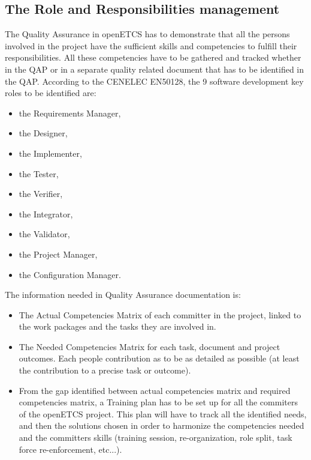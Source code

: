 \documentclass[openetcs]{template/openetcs_article}
\begin{document}
\subsection{The Role and Responsibilities management}
The Quality Assurance in openETCS has to demonstrate that all the persons involved in the project have the sufficient skills and competencies to fulfill their
responsibilities. All these competencies have to be gathered and tracked whether in the QAP or in a separate quality related document that has to be identified
in the QAP.
According to the CENELEC EN50128, the 9 software development key roles to be identified are:
\begin{itemize}
\item the Requirements Manager,
\item the Designer,
\item the Implementer,
\item the Tester,
\item the Verifier,
\item the Integrator,
\item the Validator,
\item the Project Manager,
\item the Configuration Manager.
\end{itemize}

The information needed in Quality Assurance documentation is:
\begin{itemize}
\item The Actual Competencies Matrix of each committer in the project, linked to the work packages and the tasks they are involved in.
\item The Needed Competencies Matrix for each task, document and project outcomes. Each people contribution as to be as detailed as possible (at least the
contribution to a precise task or outcome).
\item From the gap identified between actual competencies matrix and required competencies matrix, a Training plan has to be set up for all the commiters of the
openETCS project. This plan will have to track all the identified needs, and then the solutions chosen in order to harmonize the competencies needed and the
committers skills (training session, re-organization, role split, task force re-enforcement, etc...).
\end{itemize}
\end{document}
